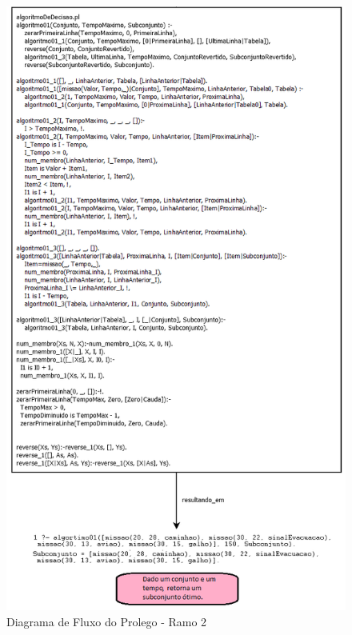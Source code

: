 \FloatBarrier
\begin{figure}[!h]
\centering
\includegraphics[keepaspectratio=true,scale=0.7]{figuras/DiagramaRamo2.png}
\caption{Diagrama de Fluxo do Prolego - Ramo 2}
\label{DiagramaRamo2}
\end{figure}



